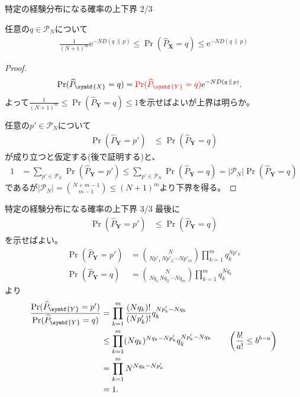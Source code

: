 \documentclass[lualatex,handout]{beamer}
\newcommand{\mycolor}[2]{%
  \begingroup
  \colorlet{currentcolor}{.}%
  \color{#1}#2%
  \color{currentcolor}%
  \endgroup
}
\newcommand{\emm}[1]{\mycolor{red}{#1}}
\newcommand\KL[2]{D(#1\,\|\,#2)}
\theoremstyle{definition}
\begin{document}
\begin{frame}{特定の経験分布になる確率の上下界 2/3}
\footnotesize
\begin{lemma}
任意の$q\in\mathcal{P}_N$について
\begin{align*}
\frac1{(N+1)^m}\mathrm{e}^{-N \KL{q}{p}}\le
\Pr(\widehat{P}_{\symbf{X}} = q)
\le \mathrm{e}^{-N \KL{q}{p}}
\end{align*}
\end{lemma}
\begin{proof}
\vspace{-2em}
\begin{align*}
\Pr(\widehat{P}_{\symbf{X}}= q) &= \emm{\Pr(\widehat{P}_{\symbf{Y}}= q)}\mathrm{e}^{-N \KL{q}{p}}.
\end{align*}
よって$\frac1{(N+1)^m}\le\Pr(\widehat{P}_{\symbf{Y}}= q)\le 1$を示せばよいが上界は明らか。

%
任意の$p'\in\mathcal{P}_N$について
\begin{align*}
\Pr\left(\widehat{P}_{\symbf{Y}}= p'\right)&\le
\Pr\left(\widehat{P}_{\symbf{Y}}= q\right)
\end{align*}
が成り立つと仮定する(後で証明する)と、
\begin{align*}
1&=\sum_{p'\in\mathcal{P}_N} \Pr\left(\widehat{P}_{\symbf{Y}}= p'\right)
\le\sum_{p'\in\mathcal{P}_N} \Pr\left(\widehat{P}_{\symbf{Y}}= q\right)
=|\mathcal{P}_N| \Pr\left(\widehat{P}_{\symbf{Y}}= q\right)
\end{align*}
であるが$|\mathcal{P}_N|=\binom{N+m-1}{m-1}\le (N+1)^m$より下界を得る。
\end{proof}
\end{frame}

\begin{frame}{特定の経験分布になる確率の上下界 3/3}
\small
最後に
\begin{align*}
\Pr\left(\widehat{P}_{\symbf{Y}}= p'\right)&\le
\Pr\left(\widehat{P}_{\symbf{Y}}= q\right)
\end{align*}
を示せばよい。
\begin{align*}
\Pr(\widehat{P}_{\symbf{Y}}= p') &= \binom{N}{Np'_1\,Np'_2\,\dotsm Np'_m} \prod_{k=1}^m q_k^{Np'_k}\\
\Pr(\widehat{P}_{\symbf{Y}}= q) &= \binom{N}{Nq_1\,Nq_2\,\dotsm Nq_m} \prod_{k=1}^m q_k^{Nq_k}
\end{align*}
より
\begin{align*}
\frac{\Pr(\widehat{P}_{\symbf{Y}}= p')}{\Pr(\widehat{P}_{\symbf{Y}}= q)}&=\prod_{k=1}^m\frac{(Nq_k)!}{(Np'_k)!}q_k^{Np'_k-Nq_k}\\
&\le\prod_{k=1}^m(Nq_k)^{Nq_k - Np'_k}q_k^{Np'_k-Nq_k}\qquad \left(\frac{b!}{a!}\le b^{b-a}\right)\\
&=\prod_{k=1}^mN^{Nq_k - Np'_k}\\
&=1.\qedhere
\end{align*}
\end{frame}
\end{document}
